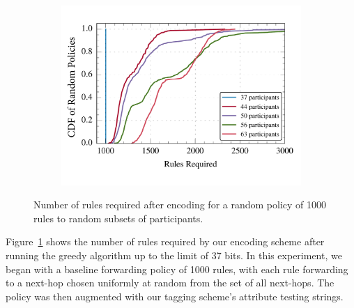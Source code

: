 \begin{figure}[t!] 
\begin{minipage}{1\linewidth}
\begin{subfigure}[b]{0.96\linewidth}
\includegraphics[width=\linewidth]{figures/rule_cdf}
\end{subfigure} 
\end{minipage} 
\caption{Number of rules required after encoding for a random policy of 1000 rules to random subsets of participants.}
\label{fig:rules}
\end{figure}

Figure~\ref{fig:rules} shows the number of rules required by our encoding scheme after running the greedy algorithm up to the limit of 37 bits. In this experiment, we began with a baseline forwarding policy of 1000 rules, with each rule forwarding to a next-hop chosen uniformly at random from the set of all next-hops. The policy was then augmented with our tagging scheme's attribute testing strings.

